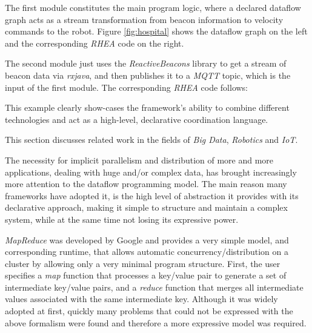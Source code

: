 \documentclass{dithesis}
\begin{document}
The first module constitutes the main program logic, where a declared dataflow graph acts as a stream transformation from beacon information to velocity commands to the robot. Figure \ref{fig:hospital} shows the dataflow graph on the left and the corresponding \textit{RHEA} code on the right.


The second module just uses the \textit{ReactiveBeacons} library to get a stream of beacon data via \textit{rxjava}, and then publishes it to a \textit{MQTT} topic, which is the input of the first module. The corresponding \textit{RHEA} code follows:
\\

This example clearly show-cases the framework's ability to combine different technologies and act as a high-level, declarative coordination language.




This section discusses related work in the fields of \textit{Big Data}, \textit{Robotics} and \textit{IoT}.


The necessity for implicit parallelism and distribution of more and more applications, dealing with huge and/or complex data, has brought increasingly more attention to the dataflow programming model. The main reason many frameworks have adopted it, is the high level of abstraction it provides with its declarative approach, making it simple to structure and maintain a complex system, while at the same time not losing its expressive power.


\textit{MapReduce} was developed by Google and provides a very simple model, and corresponding runtime, that allows automatic concurrency/distribution on a cluster by allowing only a very minimal program structure. First, the user specifies a \textit{map} function that processes a key/value pair to generate a set of intermediate key/value pairs, and a \textit{reduce} function that merges all intermediate values associated with the same intermediate key. Although it was widely adopted at first, quickly many problems that could not be expressed with the above formalism were found and therefore a more expressive model was required.
\end{document}
